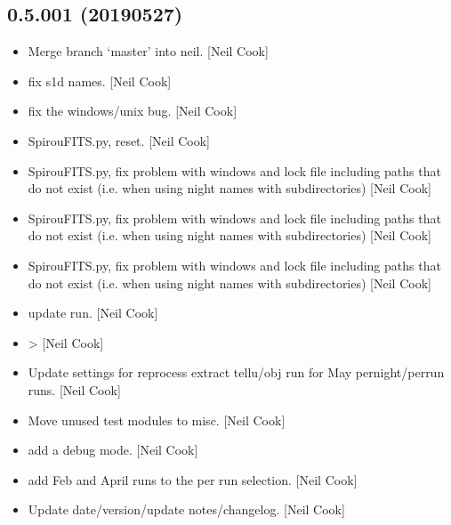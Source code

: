 \documentclass[a4paper,10pt,english]{report}
\begin{document}
\subsection{0.5.001 (2019\sphinxhyphen{}05\sphinxhyphen{}27)}
\label{\detokenize{misc/changelog:id154}}\begin{itemize}
\item {} 
Merge branch ‘master’ into neil. {[}Neil Cook{]}

\item {} 
 \sphinxhyphen{} fix s1d names. {[}Neil Cook{]}

\item {} 
 \sphinxhyphen{} fix the windows/unix  bug. {[}Neil Cook{]}

\item {} 
SpirouFITS.py,  \sphinxhyphen{} reset. {[}Neil Cook{]}

\item {} 
SpirouFITS.py,  \sphinxhyphen{} fix problem with windows and lock file
including paths that do not exist (i.e. when using night names with
sub\sphinxhyphen{}directories) {[}Neil Cook{]}

\item {} 
SpirouFITS.py,  \sphinxhyphen{} fix problem with windows and lock file
including paths that do not exist (i.e. when using night names with
sub\sphinxhyphen{}directories) {[}Neil Cook{]}

\item {} 
SpirouFITS.py,  \sphinxhyphen{} fix problem with windows and lock file
including paths that do not exist (i.e. when using night names with
sub\sphinxhyphen{}directories) {[}Neil Cook{]}

\item {} 
 \sphinxhyphen{} update run. {[}Neil Cook{]}

\item {} 
 \sphinxhyphen{}  \textendash{}\textgreater{}  {[}Neil Cook{]}

\item {} 
Update settings for reprocess extract tellu/obj run for May
pernight/perrun runs. {[}Neil Cook{]}

\item {} 
Move unused test modules to misc. {[}Neil Cook{]}

\item {} 
 \sphinxhyphen{} add a debug mode. {[}Neil Cook{]}

\item {} 
 \sphinxhyphen{} add Feb and April runs to the per
run selection. {[}Neil Cook{]}

\item {} 
Update date/version/update notes/changelog. {[}Neil Cook{]}

\end{itemize}
\end{document}
